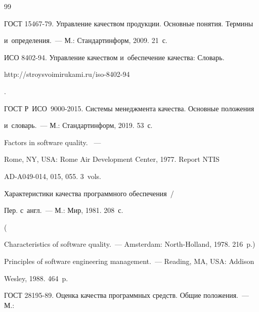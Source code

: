 {\small\frenchspacing

{%


\begin{thebibliography}{99}



\vspace*{-4pt}




  ГОСТ 15467-79. Управление качеством продукции. Основные понятия. Термины 

и~определения.~--- М.: Стандартинформ, 2009. 21~с. 


  ИСО 8402-94. Управление качеством и~обеспечение качества: Словарь. {\sf 

http://stroysvoimirukami.ru/iso-8402-94}. 


  ГОСТ Р~ИСО~9000-2015. Системы менеджмента качества. Основные положения 

и~словарь.~--- М.: Стандартинформ, 2019. 53~с.


   Factors in software quality. ~--- 

  Rome, NY, USA: Rome Air Development Center, 1977. Report NTIS 

AD-A049-014, 015, 055. 3~vols.


   Характеристики качества программного обеспечения~/

  Пер. с~англ.~--- М.: Мир,  1981. 208~с.

  ( 

{Characteristics of software quality}.~---  Amsterdam: North-Holland, 1978. 216~p.)


   Principles of software engineering management.~--- Reading, MA, USA: Addison 

Wesley, 1988. 464~p.


  ГОСТ 28195-89. Оценка качества программных средств. Общие положения.~--- М.: 


\end{thebibliography}}}
